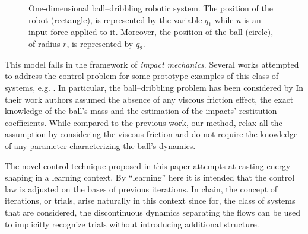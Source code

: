 {\begin{figure}[!t]
	\centering
	\caption{\footnotesize One-dimensional ball--dribbling robotic system. The position of the robot (rectangle), is represented by the variable $q_1$ while $u$ is an input force applied to it. Moreover, the position of the ball (circle), of radius $r$, is represented by $q_2$. }
	\label{fig:1D}
\end{figure}
This model falls in the framework of \textit{impact mechanics}. Several works attempted to address the control problem for some prototype examples of this class of systems, e.g. \cite{sanfelice2007hybrid,tian2013juggling,6094506}. In particular, the ball--dribbling problem has been considered by \cite{Batz2010} In their work authors assumed the absence of any viscous friction effect, the exact knowledge of the ball's mass and the estimation of the impacts' restitution coefficients. While compared to the previous work, our method, relax all the assumption by considering the viscous friction and do not require the knowledge of any parameter characterizing the ball's dynamics.

The novel control technique proposed in this paper attempts at casting energy shaping in a learning context. By ``learning'' here it is intended that the control law is adjusted on the bases of previous iterations. In chain, the concept of iterations, or trials, arise naturally in this context since for, the class of systems that are considered, the discontinuous dynamics separating the flows can be used to implicitly recognize trials without introducing additional structure.

}
